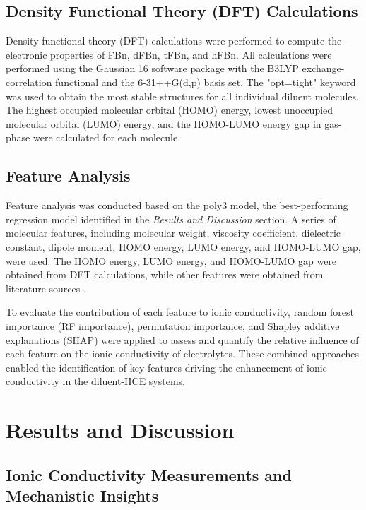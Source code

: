 \documentclass[11pt, a4paper]{article}
\begin{document}
\subsection{Density Functional Theory (DFT) Calculations}

Density functional theory (DFT) calculations were performed to compute the electronic properties of FBn, dFBn, tFBn, and hFBn. All calculations were performed using the Gaussian 16 software package with the B3LYP exchange-correlation functional and the 6-31++G(d,p) basis set\cite{ref.16}. The "opt=tight" keyword was used to obtain the most stable structures for all individual diluent molecules. The highest occupied molecular orbital (HOMO) energy, lowest unoccupied molecular orbital (LUMO) energy, and the HOMO-LUMO energy gap in gas-phase were calculated for each molecule.

\subsection{Feature Analysis}

Feature analysis was conducted based on the poly3 model, the best-performing regression model identified in the {\itshape Results and Discussion} section. A series of molecular features, including molecular weight, viscosity coefficient, dielectric constant, dipole moment, HOMO energy, LUMO energy, and HOMO-LUMO gap, were used. The HOMO energy, LUMO energy, and HOMO-LUMO gap were obtained from DFT calculations, while other features were obtained from literature sources\cite{ref.8}-\cite{ref.11}.

To evaluate the contribution of each feature to ionic conductivity, random forest importance (RF importance)\cite{ref.17}, permutation importance\cite{ref.18}, and Shapley additive explanations (SHAP)\cite{ref.15} were applied to assess and quantify the relative influence of each feature on the ionic conductivity of electrolytes. These combined approaches enabled the identification of key features driving the enhancement of ionic conductivity in the diluent-HCE systems.

\section{Results and Discussion}

\subsection{Ionic Conductivity Measurements and Mechanistic Insights}
\end{document}
